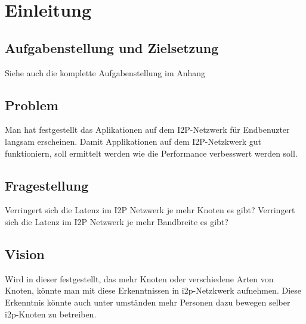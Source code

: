 \chapter{Einleitung}
\label{ch:Einleitung}

\section{Aufgabenstellung und Zielsetzung}

Siehe auch die komplette Aufgabenstellung im Anhang 

\section{Problem}

Man hat festgestellt das Aplikationen auf dem I2P-Netzwerk für Endbenuzter langsam erscheinen.
Damit Applikationen auf dem I2P-Netzkwerk gut funktioniern, soll ermittelt werden wie die Performance
verbesswert werden soll.

\section{Fragestellung}

Verringert sich die Latenz im I2P Netzwerk je mehr Knoten es gibt?
Verringert sich die Latenz im I2P Netzwerk je mehr Bandbreite es gibt?

\section{Vision}

Wird in dieser festgestellt, das mehr Knoten oder verschiedene Arten von Knoten, könnte man mit diese Erkenntnissen in i2p-Netzkwerk aufnehmen.
Diese Erkenntnis könnte auch unter umständen mehr Personen dazu bewegen selber i2p-Knoten zu betreiben.

